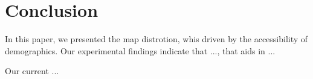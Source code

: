 \documentclass[journal]{vgtc}                %
\begin{document}
\section{Conclusion}

In this paper, we presented the map distrotion, whis driven by the accessibility of demographics. Our experimental findings indicate that ..., that aids in ...

Our current ...


 





%

%
%
%


\end{document}
